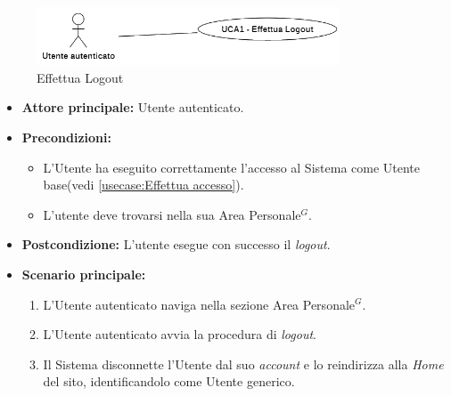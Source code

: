 \newpage
{}
\label{usecase:Effettua Logout}

\begin{figure}[h]
	\centering
	\includegraphics[width=0.8\textwidth]{./uml/UCA1.png} 
	\caption{Effettua Logout}
	\label{fig:UCA1}
  \end{figure}

\begin{itemize}
	\item \textbf{Attore principale:} Utente autenticato.

	\item \textbf{Precondizioni:}
	\begin{itemize}
        \item L'Utente ha eseguito correttamente l'accesso al Sistema come Utente base(vedi \autoref{usecase:Effettua accesso}).
        \item L'utente deve trovarsi nella sua Area Personale$^G$.
    \end{itemize}

	\item \textbf{Postcondizione:} L'utente esegue con successo il \textit{logout}.

	\item \textbf{Scenario principale:}
	      \begin{enumerate}
		      \item L'Utente autenticato naviga nella sezione Area Personale$^G$.
		      \item L'Utente autenticato avvia la procedura di \textit{logout}.
              \item Il Sistema disconnette l'Utente dal suo \textit{account} e lo reindirizza alla \textit{Home} del sito, identificandolo come Utente generico.
	      \end{enumerate}
\end{itemize}
